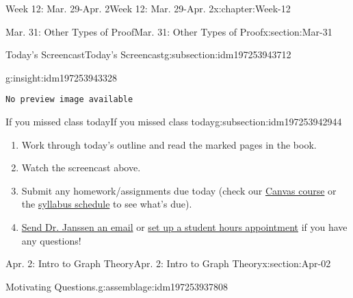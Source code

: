 \documentclass[oneside,10pt,]{book}
\newcommand{\mono}[1]{\texttt{#1}}
\numberwithin{equation}{section}
\newlength{\qrsize}
\newlength{\previewwidth}
\begin{document}
\begin{chapterptx}{Week 12: Mar. 29-Apr. 2}{}{Week 12: Mar. 29-Apr. 2}{}{}{x:chapter:Week-12}
\begin{sectionptx}{Mar. 31: Other Types of Proof}{}{Mar. 31: Other Types of Proof}{}{}{x:section:Mar-31}
\begin{subsectionptx}{Today's Screencast}{}{Today's Screencast}{}{}{g:subsection:idm197253943712}
\begin{insight}{}{g:insight:idm197253943328}%
\setlength{\qrsize}{9em}
\setlength{\previewwidth}{\linewidth}
\addtolength{\previewwidth}{-\qrsize}
\begin{tcbraster}[raster columns=2, raster column skip=1pt, raster halign=center, raster force size=false, raster left skip=0pt, raster right skip=0pt]%
\begin{tcolorbox}[previewstyle, width=\previewwidth]%
\mono{No preview image available}%
\end{tcolorbox}%
\begin{tcolorbox}[qrstyle]%
[QR LINK]\end{tcolorbox}%
\end{tcbraster}%
\end{insight}
\end{subsectionptx}
%
%
\typeout{************************************************}
\typeout{************************************************}
%
\begin{subsectionptx}{If you missed class today}{}{If you missed class today}{}{}{g:subsection:idm197253942944}
%
\begin{enumerate}
\item{}Work through today's outline and read the marked pages in the book.%
\item{}Watch the screencast above.%
\item{}Submit any homework\slash{}assignments due today (check our \href{https://dordt.instructure.com/courses/3110050}{Canvas course} or the \href{https://prof.mkjanssen.org/ds/index.html\#schedule}{syllabus schedule} to see what's due).%
\item{}\href{mailto:mike.janssen@dordt.edu}{Send Dr. Janssen an email} or \href{https://calendly.com/mkjanssen/student-hours}{set up a student hours appointment} if you have any questions!%
\end{enumerate}
\end{subsectionptx}
\end{sectionptx}
%
%
\typeout{************************************************}
\typeout{************************************************}
%
\begin{sectionptx}{Apr. 2: Intro to Graph Theory}{}{Apr. 2: Intro to Graph Theory}{}{}{x:section:Apr-02}
\begin{introduction}{}%
\begin{assemblage}{Motivating Questions.}{g:assemblage:idm197253937808}%

\end{assemblage}
\end{introduction}
\end{sectionptx}
\end{chapterptx}
\end{document}

